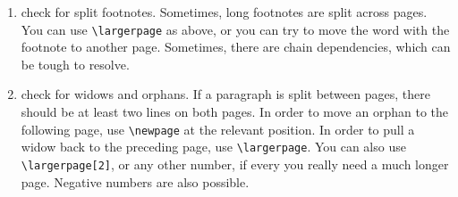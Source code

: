 \begin{enumerate}
\texttt{[b]}ottom of page,
separate \texttt{[p]}age. You can use several of these options, e.g. \verb+\begin{figure}[ht]+ to place a figure either exactly where it is in the document or on the top of this page or another page.  A figure should generally appear as close to the text which refers to it, either on the same page or a following page. If the figure is on a following page, it is preferable that the reader does not have to turn the page. Next to the parameters \verb+[hbpt]+, you can also change the position of the relevant lines of source code to ``move'' a figure to the top or bottom of another page of the pdf. Finally, you can also slightly change the size of the figure or table to be able to fit it on the desired page.
                                                                            
\item check for split footnotes. Sometimes, long footnotes are split across pages. You can use \verb+\largerpage+ as above, or you can try to move the word with the footnote to another page. Sometimes, there are chain dependencies, which can be tough to resolve.


\item check for widows and orphans. If a paragraph is split between pages, there should be at least two lines on both pages. In order to move  an orphan to the following page, use \verb+\newpage+ at the relevant position. In order to pull a widow back to the preceding page, use \verb+\largerpage+. You can also use \verb+\largerpage[2]+, or any other number, if every you really need a much longer page. Negative numbers are also possible. 

\end{enumerate} 

